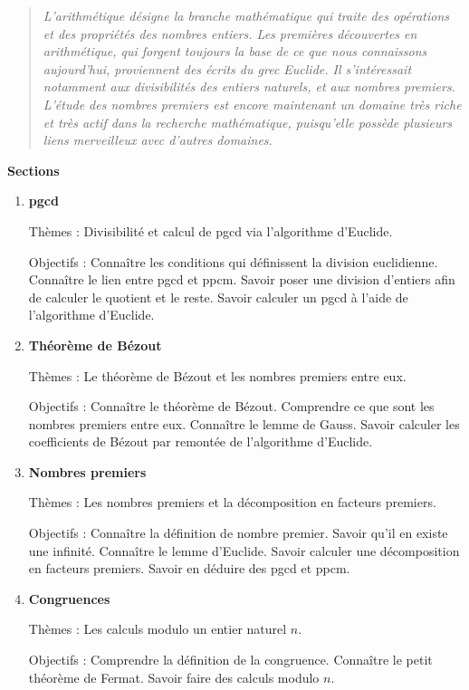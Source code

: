 \documentclass[11pt,a4paper]{report}
\begin{document}



\bigskip
\bigskip

\begin{quote}
\center
\emph{
    L'arithmétique désigne la branche mathématique qui traite des opérations et des propriétés des nombres entiers. Les premières découvertes en arithmétique, qui forgent toujours la base de ce que nous connaissons aujourd'hui, proviennent des écrits du grec Euclide. Il s'intéressait notamment aux divisibilités des entiers naturels, et aux nombres premiers. L'étude des nombres premiers est encore maintenant un domaine très riche et très actif dans la recherche mathématique, puisqu'elle possède plusieurs liens merveilleux avec d'autres domaines.}
\end{quote}

\bigskip
\bigskip


\textbf{Sections}
\begin{enumerate}[label=\arabic*.]
    \item \textbf{pgcd}
    
    Thèmes : Divisibilité et calcul de pgcd via l'algorithme d'Euclide.
    
    Objectifs :
    Connaître les conditions qui définissent la division euclidienne.
    Connaître le lien entre pgcd et ppcm.
    Savoir poser une division d'entiers afin de calculer le quotient et le reste.
    Savoir calculer un pgcd à l'aide de l'algorithme d'Euclide.    
    
    \item  \textbf{Théorème de Bézout}
    
    Thèmes : Le théorème de Bézout et les nombres premiers entre eux.
    
    Objectifs :     
    Connaître le théorème de Bézout.
    Comprendre ce que sont les nombres premiers entre eux.
    Connaître le lemme de Gauss.
    Savoir calculer les coefficients de Bézout par remontée de l'algorithme d'Euclide.  
      
    \item  \textbf{Nombres premiers}
    
    Thèmes : Les nombres premiers et la décomposition en facteurs premiers.
    
    Objectifs : 
    Connaître la définition de nombre premier.
    Savoir qu'il en existe une infinité.
    Connaître le lemme d'Euclide.
    Savoir calculer une décomposition en facteurs premiers.
    Savoir en déduire des pgcd et ppcm.    
    
      
    \item  \textbf{Congruences}
    
    Thèmes : Les calculs modulo un entier naturel $n$.
    
    Objectifs : 
	Comprendre la définition de la congruence.
    Connaître le petit théorème de Fermat.
    Savoir faire des calculs modulo $n$.     
\end{enumerate}
\end{document}
